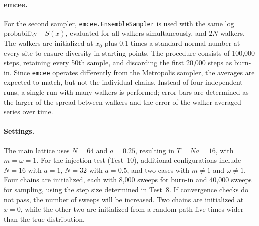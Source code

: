 \documentclass[11pt]{article}
\begin{document}
\paragraph{emcee.} For the second sampler, \texttt{emcee.EnsembleSampler} is used with the same log probability $-S(x)$, evaluated for all walkers simultaneously, and $2N$ walkers. The walkers are initialized at $x_0$ plus 0.1 times a standard normal number at every site to ensure diversity in starting points. The procedure consists of 100,000 steps, retaining every 50th sample, and discarding the first 20,000 steps as burn-in. Since \texttt{emcee} operates differently from the Metropolis sampler, the averages are expected to match, but not the individual chains. Instead of four independent runs, a single run with many walkers is performed; error bars are determined as the larger of the spread between walkers and the error of the walker-averaged series over time.

\paragraph{Settings.} The main lattice uses $N = 64$ and $a = 0.25$, resulting in $T = Na = 16$, with $m = \omega = 1$. For the injection test (Test~10), additional configurations include $N = 16$ with $a = 1$, $N = 32$ with $a = 0.5$, and two cases with $m \ne 1$ and $\omega \ne 1$. Four chains are initialized, each with 8,000 sweeps for burn-in and 40,000 sweeps for sampling, using the step size determined in Test~8. If convergence checks do not pass, the number of sweeps will be increased. Two chains are initialized at $x = 0$, while the other two are initialized from a random path five times wider than the true distribution.
\end{document}
